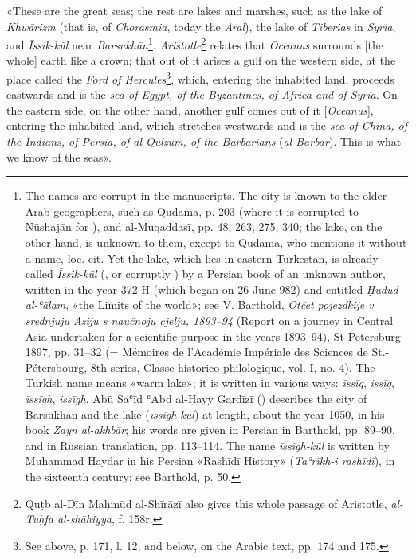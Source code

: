\documentclass[11pt]{article}
\newcommand{\Pg}[1]{\marginpar{\footnotesize\color{gray}#1}}
\begin{document}
\par \Pg{I 173}«These are the great seas; the rest are lakes and marshes, such as the lake of \emph{Khwārizm} (that is, of \emph{Chorasmia}, today the \emph{Aral}), the lake of \emph{Tiberias} in \emph{Syria}, and \emph{Īssik-kūl} near \emph{Barsukhān}\footnote{The names are corrupt in the manuscripts. The city is known to the older Arab geographers, such as Qudāma, p. 203 (where it is corrupted to  Nūshajān for ), and al-Muqaddasī, pp. 48, 263, 275, 340; the lake, on the other hand, is unknown to them, except to Qudāma, who mentions it without a name, loc. cit. Yet the lake, which lies in eastern Turkestan, is already called \emph{Īssik-kūl} (, or corruptly ) by a Persian book of an unknown author, written in the year 372 H (which began on 26 June 982) and entitled \emph{Ḥudūd al-ʿālam}, «the Limits of the world»; see V. Barthold, \emph{Otčet pojezdkije v srednjuju Aziju s naučnoju cjelju, 1893–94} (Report on a journey in Central Asia undertaken for a scientific purpose in the years 1893–94), St Petersburg 1897, pp. 31–32 (= Mémoires de l’Académie Impériale des Sciences de St.-Pétersbourg, 8th series, Classe historico-philologique, vol. I, no. 4). The Turkish name means «warm lake»; it is written in various ways: \emph{īssīq}, \emph{issīq}, \emph{īssīgh}, \emph{issīgh}. Abū Saʿīd ʿAbd al-Ḥayy Gardīzī () describes the city of Barsukhān and the lake (\emph{īssigh-kūl}) at length, about the year 1050, in his book \emph{Zayn al-akhbār}; his words are given in Persian in Barthold, pp. 89–90, and in Russian translation, pp. 113–114. The name \emph{īssīgh-kūl} is written by Muḥammad Ḥaydar in his Persian «Rashīdī History» (\emph{Taʾrīkh-i rashīdī}), in the sixteenth century; see Barthold, p. 50.}. \emph{Aristotle}\footnote{Quṭb al-Dīn Maḥmūd al-Shīrāzī also gives this whole passage of Aristotle, \emph{al-Tuḥfa al-shāhiyya}, f. 158r.} relates that \emph{Oceanus} surrounds [the whole] earth like a crown; that out of it arises a gulf on the western side, at the place called the \emph{Ford of Hercules}\footnote{See above, p. 171, l. 12, and below, on the Arabic text, pp. 174 and 175.}, which, entering the inhabited land, proceeds eastwards and is the \emph{sea of Egypt, of the Byzantines, of Africa and of Syria}. On the eastern side, on the other hand, another gulf comes out of it [\emph{Oceanus}], entering the inhabited land, which stretches westwards and is the \emph{sea of China, of the Indians, of Persia, of al-Qulzum, of the Barbarians} (\emph{al-Barbar}). This is what we know of the seas».\par
\end{document}
